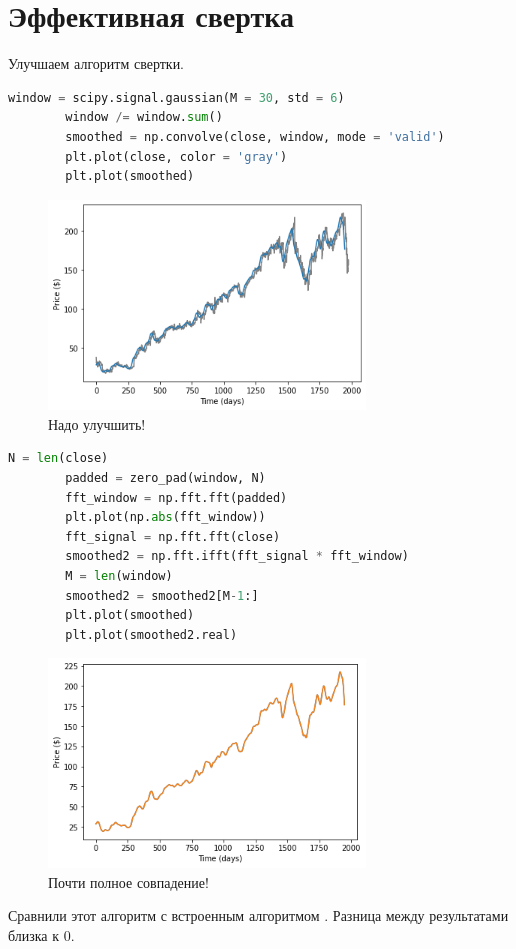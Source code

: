 \documentclass[a4paper, 12pt]{report}
\begin{document}
	\chapter{Эффективная свертка}
	Улучшаем алгоритм свертки.
	\begin{lstlisting}[language=Python,caption=Исходная свертка]
		window = scipy.signal.gaussian(M = 30, std = 6)
		window /= window.sum()
		smoothed = np.convolve(close, window, mode = 'valid')
		plt.plot(close, color = 'gray')
		plt.plot(smoothed)
	\end{lstlisting}
	\begin{figure}[H]
		\centering
		\includegraphics[width=0.75\textwidth]{test12.png}
		\caption{Надо улучшить!}
		\label{fig:test12}
	\end{figure}
	\begin{lstlisting}[language=Python,caption=Улучшаем алгоритм свертки]
		N = len(close)
		padded = zero_pad(window, N)
		fft_window = np.fft.fft(padded)
		plt.plot(np.abs(fft_window))
		fft_signal = np.fft.fft(close)
		smoothed2 = np.fft.ifft(fft_signal * fft_window)
		M = len(window)
		smoothed2 = smoothed2[M-1:]
		plt.plot(smoothed)
		plt.plot(smoothed2.real)
	\end{lstlisting}
	\begin{figure}[H]
		\centering
		\includegraphics[width=0.75\textwidth]{test13.png}
		\caption{Почти полное совпадение!}
		\label{fig:test13}
	\end{figure}
	Сравнили этот алгоритм с встроенным алгоритмом . Разница между результатами близка к 0.
	
\end{document}
